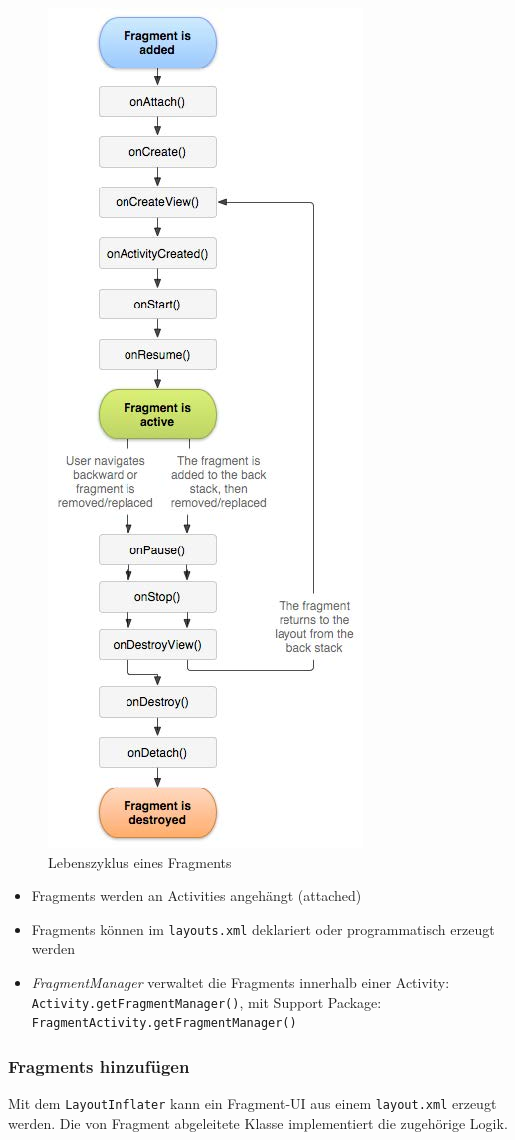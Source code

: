 \documentclass[a4paper]{article}
\begin{document}
	\begin{figure}[!htb]
		\centering
		\includegraphics[width=.3\textwidth]{img/android6/fragment_lifecycle.jpg}
		\caption{Lebenszyklus eines Fragments}
		\label{fig:fragment_lifecycle}
	\end{figure}

	\begin{itemize}
		
		\item Fragments werden an Activities angehängt (attached)
		
		\item Fragments können im \texttt{layouts.xml} deklariert oder programmatisch erzeugt werden
		
		\item \textit{FragmentManager} verwaltet die Fragments innerhalb einer Activity:\\
				\texttt{Activity.getFragmentManager()}, mit Support Package:\\
				\texttt{FragmentActivity.getFragmentManager()}
		
	\end{itemize}

		\newpage
		
		\subsubsection{Fragments hinzufügen}
	
		Mit dem \texttt{LayoutInflater} kann ein Fragment-UI aus einem \texttt{layout.xml} erzeugt werden. Die von Fragment abgeleitete Klasse implementiert die zugehörige Logik.
		
\end{document}
